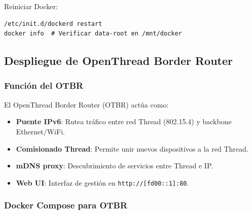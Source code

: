 Reiniciar Docker:
\begin{verbatim}
/etc/init.d/dockerd restart
docker info  # Verificar data-root en /mnt/docker
\end{verbatim}

\subsection{Despliegue de OpenThread Border Router}

\subsubsection{Función del OTBR}

El OpenThread Border Router (OTBR) actúa como:
\begin{itemize}
    \item \textbf{Puente IPv6}: Rutea tráfico entre red Thread (802.15.4) y backbone Ethernet/WiFi.
    \item \textbf{Comisionado Thread}: Permite unir nuevos dispositivos a la red Thread.
    \item \textbf{mDNS proxy}: Descubrimiento de servicios entre Thread e IP.
    \item \textbf{Web UI}: Interfaz de gestión en \texttt{http://[fd00::1]:80}.
\end{itemize}

\subsubsection{Docker Compose para OTBR}

